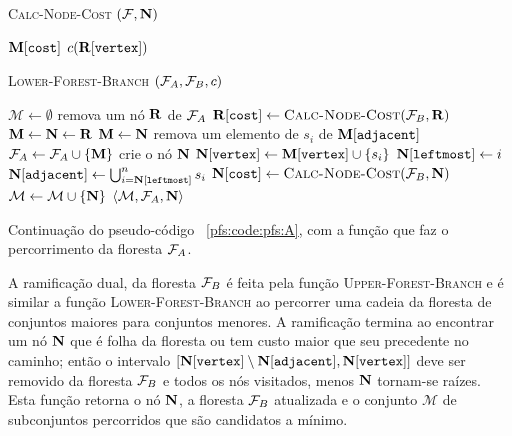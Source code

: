 \begin{algorithm}[H]
\textsc{Calc-Node-Cost} $(\mathcal{F}, \mathbf N)$
\begin{algorithmic}[1]
    \Return $\mathbf M[\texttt{cost}]$
\Else
    \Return $c(\mathbf R[\texttt{vertex}])$
\EndIf
\end{algorithmic}
\end{algorithm}

\begin{algorithm}[ht]
\textsc{Lower-Forest-Branch} $(\mathcal{F}_A, \mathcal{F}_B, c)$
\begin{algorithmic}[1]
    \State $\mathcal{M} \gets \emptyset$
    \State remova um nó $\mathbf R$ de $\mathcal{F}_A$
    \State $\mathbf R[\texttt{cost}] \gets {\normalfont\textsc{Calc-Node-Cost}}(\mathcal{F}_B, \mathbf R)$
    \State $\mathbf M \gets \mathbf N \gets \mathbf R$
        \State $\mathbf M \gets \mathbf N$
        \State remova um elemento de $s_i$ de $\mathbf M[\texttt{adjacent}]$
        \State $\mathcal{F}_A \gets \mathcal{F}_A \cup \{\mathbf M\}$
        \State crie o nó $\mathbf N$
        \State $\mathbf N[\texttt{vertex}] \gets \mathbf M[\texttt{vertex}] \cup \{s_i\}$
        \State $\mathbf N[\texttt{leftmost}] \gets i$
        \State $\mathbf N[\texttt{adjacent}] \gets \bigcup_{i=\mathbf N[\texttt{leftmost}]}^{n} s_i$
        \State $\mathbf N[\texttt{cost}] \gets {\normalfont\textsc{Calc-Node-Cost}} (\mathcal{F}_B, \mathbf N)$
        \State $\mathcal{M} \gets \mathcal{M} \cup \{\mathbf N\}$
    \EndWhile
    \Return $\langle \mathcal{M}, \mathcal{F}_A, \mathbf N\rangle$
\end{algorithmic}
\caption{Continuação do pseudo-código ~\ref{pfs:code:pfs:A}, com a função
que faz o percorrimento da floresta $\mathcal{F}_A$.}
\label{pfs:code:pfs:B}
\end{algorithm}


A ramificação dual, da floresta $\mathcal{F}_B$ é feita pela função 
\textsc{Upper-Forest-Branch} e é similar a função 
\textsc{Lower-Forest-Branch} ao percorrer uma cadeia da floresta de 
conjuntos maiores para conjuntos menores. A ramificação termina ao 
encontrar um nó $\mathbf N$ que é folha da floresta ou tem custo maior
que seu precedente no caminho; então o intervalo 
$[\mathbf N[\texttt{vertex}] \setminus \mathbf N[\texttt{adjacent}], \mathbf N[\texttt{vertex}]]$
deve ser removido da floresta $\mathcal{F}_B$ e todos os nós visitados, 
menos $\mathbf N$ tornam-se raízes. Esta função retorna o nó
$\mathbf N$, a floresta $\mathcal{F}_B$ atualizada e o conjunto 
$\mathcal{M}$ de subconjuntos percorridos que são candidatos a mínimo.


